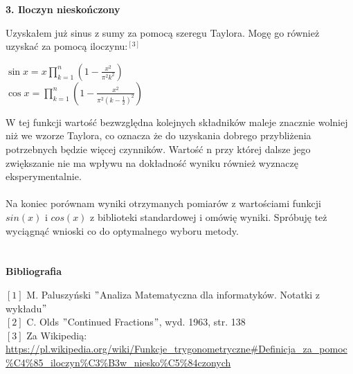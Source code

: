 \documentclass[a4paper]{article}
\begin{document}
\textbf{3. Iloczyn nieskończony}

Uzyskałem już sinus z sumy za pomocą szeregu Taylora. Mogę go również uzyskać za pomocą iloczynu:$^{[3]}$
\begin{center}
\large
$\sin x=x\prod _{{k=1}}^{n}\left(1-{\tfrac  {x^{2}}{\pi ^{2}k^{2}}}\right)$\\
$\cos x=\prod _{{k=1}}^{n}\left(1-{\tfrac  {x^{2}}{\pi ^{2}(k-{\frac  {1}{2}})^{2}}}\right)$
\end{center}
W tej funkcji wartość bezwzględna kolejnych składników maleje znacznie wolniej niż we wzorze Taylora, co oznacza że do uzyskania dobrego przybliżenia potrzebnych będzie więcej czynników. Wartość n przy której dalsze jego zwiększanie nie ma wpływu na dokładność wyniku również wyznaczę eksperymentalnie.\\\\
Na koniec porównam wyniki otrzymanych pomiarów z wartościami funkcji $sin(x)$ i $cos(x)$ z biblioteki standardowej i omówię wyniki. Spróbuję też wyciągnąć wnioski co do optymalnego wyboru metody.\\\\\\

\large
\textbf{Bibliografia}

\normalsize
$[1]$ M. Paluszyński $"$Analiza Matematyczna dla informatyków. Notatki z wykładu$"$\\
$[2]$ C. Olds $"$Continued Fractions$"$, wyd. 1963, str. 138\\
$[3]$ Za Wikipedią: \url{https://pl.wikipedia.org/wiki/Funkcje_trygonometryczne#Definicja_za_pomoc%C4%85_iloczyn%C3%B3w_niesko%C5%84czonych}
\end{document}
